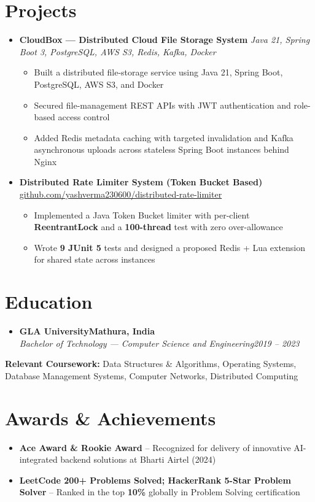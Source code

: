 \documentclass[letterpaper,11pt]{article}
\newcommand{\resumeItem}[1]{
  \item\small{{#1 \vspace{-2pt}}}
}
\newcommand{\resumeSubheading}[4]{
  \vspace{-2pt}\item
    \textbf{#1}\hfill \textbf{\small #2} \\
    \textit{\small #3}\hfill \textit{\small #4}\vspace{-7pt}
}
\newcommand{\resumeProjectHeading}[2]{
    \item
    \small #1\hfill \textbf{\small #2}\vspace{-7pt}
}
\newcommand{\resumeSubHeadingListStart}{\begin{itemize}[leftmargin=0.0in, label={}]}
\newcommand{\resumeSubHeadingListEnd}{\end{itemize}}
\newcommand{\resumeItemListStart}{\begin{itemize}}
\newcommand{\resumeItemListEnd}{\end{itemize}\vspace{-5pt}}
\begin{document}
\section{Projects}
  \resumeSubHeadingListStart
    \resumeProjectHeading
      {\textbf{CloudBox --- Distributed Cloud File Storage System} \textbar{} \textit{\small Java 21, Spring Boot 3, PostgreSQL, AWS S3, Redis, Kafka, Docker}}{}
      \resumeItemListStart
        \resumeItem{Built a distributed file-storage service using Java 21, Spring Boot, PostgreSQL, AWS S3, and Docker}
        \resumeItem{Secured file-management REST APIs with JWT authentication and role-based access control}
        \resumeItem{Added Redis metadata caching with targeted invalidation and Kafka asynchronous uploads across stateless Spring Boot instances behind Nginx}
      \resumeItemListEnd
    \resumeProjectHeading
      {\textbf{Distributed Rate Limiter System (Token Bucket Based)} \textbar{} \href{https://github.com/yashverma230600/distributed-rate-limiter}{github.com/yashverma230600/distributed-rate-limiter}}{}
      \resumeItemListStart
        \resumeItem{Implemented a Java Token Bucket limiter with per-client \textbf{ReentrantLock} and a \textbf{100-thread} test with zero over-allowance}
        \resumeItem{Wrote \textbf{9 JUnit 5} tests and designed a proposed Redis + Lua extension for shared state across instances}
      \resumeItemListEnd
  \resumeSubHeadingListEnd
\vspace{-8pt}

\section{Education}
  \resumeSubHeadingListStart
    \resumeSubheading
      {GLA University}{Mathura, India}
      {Bachelor of Technology --- Computer Science and Engineering}{2019 -- 2023}
  \resumeSubHeadingListEnd
  \vspace{-2pt}
  \begin{itemize}[leftmargin=0.15in, label={}]
    \small{\item{
      \textbf{Relevant Coursework:} Data Structures \& Algorithms, Operating Systems, Database Management Systems, Computer Networks, Distributed Computing
    }}
  \end{itemize}
\vspace{-4pt}

\section{Awards \& Achievements}
\begin{itemize}[leftmargin=0.15in]
  \item \small{\textbf{Ace Award \& Rookie Award} -- Recognized for delivery of innovative AI-integrated backend solutions at Bharti Airtel (2024)}
  \item \small{\textbf{LeetCode 200+ Problems Solved; HackerRank 5-Star Problem Solver} -- Ranked in the top \textbf{10\%} globally in Problem Solving certification}
\end{itemize}
\end{document}
